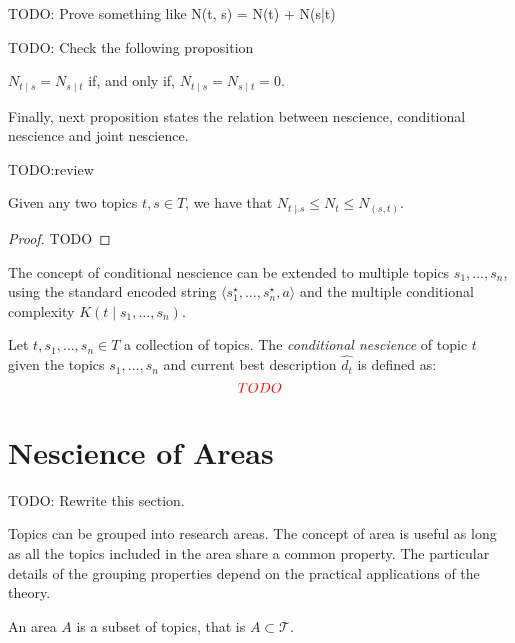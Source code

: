 {\color{red} TODO: Prove something like N(t, s) = N(t) + N(s|t)}

{\color{red} TODO: Check the following proposition}

\begin{proposition}
$N_{t \mid s} = N_{s \mid t}$ if, and only if, $N_{t \mid s} = N_{s \mid t} = 0$.
\end{proposition}

Finally, next proposition states the relation between nescience, conditional nescience and joint nescience.

{\color{red} TODO:review}

\begin{proposition}
Given any two topics $t, s \in T$, we have that $N_{t \mid s} \leq N_{t} \leq N_{(s, t)}$.
\end{proposition}
\begin{proof}
{\color{red} TODO}
\end{proof}

The concept of conditional nescience can be extended to multiple topics $s_1, \ldots, s_n$, using the standard encoded string $\langle s_1^\star, \ldots, s_n^\star, a \rangle$ and the multiple conditional complexity $K (t \mid s_1, \ldots, s_n)$.

\begin{definition}
Let $t, s_1, \ldots, s_n \in T$ a collection of topics. The \emph{conditional nescience} of topic $t$ given the topics $s_1, \ldots, s_n$ and current best description $\hat{d_t}$ is defined as: 
\[
{\color{red} TODO}
\]
\end{definition}

%
%

\section{Nescience of Areas}
\label{sec:nescience_areas}

{\color{red} TODO: Rewrite this section.}

Topics can be grouped into research areas. The concept of area is useful as long as all the topics included in the area share a common property. The particular details of the grouping properties depend on the practical applications of the theory.

\begin{definition}
An area $A$ is a subset of topics, that is $A \subset \mathcal{T}$.
\end{definition}


